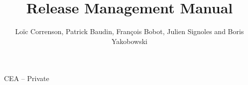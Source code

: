 \documentclass{frama-c-book}
\begin{document}
\begin{titlepage}
\title{Release Management Manual}{CEA -- Private}
\author{Loïc Correnson, Patrick Baudin, François Bobot, Julien Signoles and Boris Yakobowski}
\end{titlepage}
\tableofcontents






\end{document}

